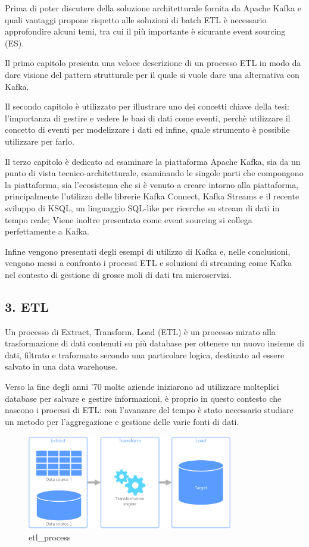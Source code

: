 \documentclass[]{article}
\begin{document}
Prima di poter discutere della soluzione architetturale fornita da
Apache Kafka e quali vantaggi propone rispetto alle soluzioni di batch
ETL è necessario approfondire alcuni temi, tra cui il più importante è
sicurante event sourcing (ES).

Il primo capitolo presenta una veloce descrizione di un processo ETL in
modo da dare visione del pattern strutturale per il quale si vuole dare
una alternativa con Kafka.

Il secondo capitolo è utilizzato per illustrare uno dei concetti chiave
della tesi: l'importanza di gestire e vedere le basi di dati come
eventi, perchè utilizzare il concetto di eventi per modelizzare i dati
ed infine, quale strumento è possibile utilizzare per farlo.

Il terzo capitolo è dedicato ad esaminare la piattaforma Apache Kafka,
sia da un punto di vista tecnico-architetturale, esaminando le singole
parti che compongono la piattaforma, sia l'ecosistema che si è venuto a
creare intorno alla piattaforma, principalmente l'utilizzo delle
librerie Kafka Connect, Kafka Streams e il recente sviluppo di KSQL, un
linguaggio SQL-like per ricerche su stream di dati in tempo reale; Viene
inoltre presentato come event sourcing si collega perfettamente a Kafka.

Infine vengono presentati degli esempi di utilizzo di Kafka e, nelle
conclusioni, vengono messi a confronto i processi ETL e soluzioni di
streaming come Kafka nel contesto di gestione di grosse moli di dati tra
microservizi.

\newpage

\hypertarget{etl}{\subsection{3. ETL}\label{etl}}

Un processo di Extract, Transform, Load (ETL) è un processo mirato alla
trasformazione di dati contenuti su più database per ottenere un nuovo
insieme di dati, filtrato e traformato secondo una particolare logica,
destinato ad essere salvato in una data warehouse.

Verso la fine degli anni '70 molte aziende iniziarono ad utilizzare
molteplici database per salvare e gestire informazioni, è proprio in
questo contesto che nascono i processi di ETL: con l'avanzare del tempo
è stato necessario studiare un metodo per l'aggregazione e gestione
delle varie fonti di dati.

\begin{figure}
\centering
\includegraphics[width=0.80000\textwidth]{../images/etl.png}
\caption{etl\_process \label{figure_4}}
\end{figure}
\end{document}
